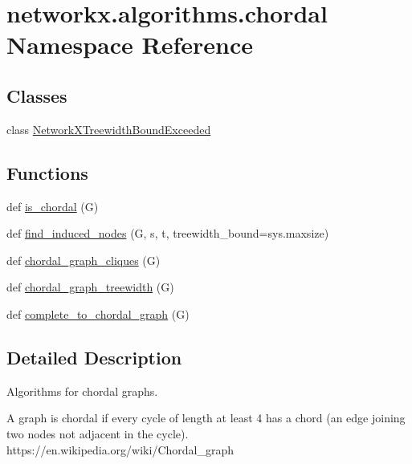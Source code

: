 \hypertarget{namespacenetworkx_1_1algorithms_1_1chordal}{}\section{networkx.\+algorithms.\+chordal Namespace Reference}
\label{namespacenetworkx_1_1algorithms_1_1chordal}
\subsection*{Classes}
\begin{DoxyCompactItemize}
\item 
class \hyperlink{classnetworkx_1_1algorithms_1_1chordal_1_1NetworkXTreewidthBoundExceeded}{Network\+X\+Treewidth\+Bound\+Exceeded}
\end{DoxyCompactItemize}
\subsection*{Functions}
\begin{DoxyCompactItemize}
\item 
def \hyperlink{namespacenetworkx_1_1algorithms_1_1chordal_a931ba6a80a30421b68ec4c3287ec4c2c}{is\+\_\+chordal} (G)
\item 
def \hyperlink{namespacenetworkx_1_1algorithms_1_1chordal_adf8d1e4874cff57394eba12dcab9a5f1}{find\+\_\+induced\+\_\+nodes} (G, s, t, treewidth\+\_\+bound=sys.\+maxsize)
\item 
def \hyperlink{namespacenetworkx_1_1algorithms_1_1chordal_a1a3217ee59ce97387bc3973eb9e480cd}{chordal\+\_\+graph\+\_\+cliques} (G)
\item 
def \hyperlink{namespacenetworkx_1_1algorithms_1_1chordal_aef7499130a6e6ada8058bebb4c2b6df8}{chordal\+\_\+graph\+\_\+treewidth} (G)
\item 
def \hyperlink{namespacenetworkx_1_1algorithms_1_1chordal_a2c5ab1c68e004234ae71af003b7f3220}{complete\+\_\+to\+\_\+chordal\+\_\+graph} (G)
\end{DoxyCompactItemize}


\subsection{Detailed Description}
\begin{DoxyVerb}Algorithms for chordal graphs.

A graph is chordal if every cycle of length at least 4 has a chord
(an edge joining two nodes not adjacent in the cycle).
https://en.wikipedia.org/wiki/Chordal_graph
\end{DoxyVerb}
 

